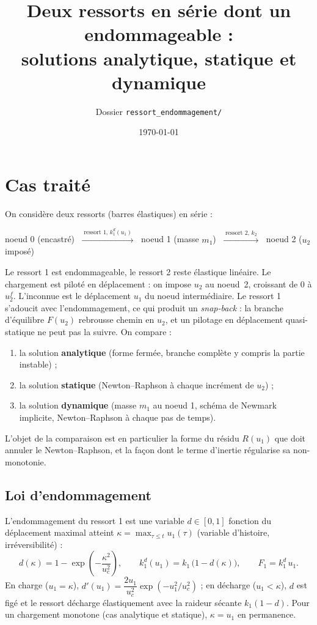 \documentclass[11pt,a4paper]{article}
\title{Deux ressorts en série dont un endommageable :\\
solutions analytique, statique et dynamique}
\author{Dossier \texttt{ressort\_endommagement/}}
\date{\today}
\newcommand{\kd}{k_1^{d}}
\begin{document}
\maketitle

\section{Cas traité}

On considère deux ressorts (barres élastiques) en série :
\begin{center}
noeud 0 (encastré) $\;\xrightarrow{\;\text{ressort 1, } \kd(u_1)\;}\;$ noeud 1 (masse $m_1$)
$\;\xrightarrow{\;\text{ressort 2, } k_2\;}\;$ noeud 2 ($u_2$ imposé)
\end{center}
Le ressort 1 est endommageable, le ressort 2 reste élastique linéaire. Le chargement est piloté en
déplacement : on impose $u_2$ au noeud~2, croissant de $0$ à $u_2^f$. L'inconnue est le déplacement
$u_1$ du noeud intermédiaire. Le ressort 1 s'adoucit avec l'endommagement, ce qui produit un
\emph{snap-back} : la branche d'équilibre $F(u_2)$ rebrousse chemin en $u_2$, et un pilotage en
déplacement quasi-statique ne peut pas la suivre. On compare :
\begin{enumerate}
  \item la solution \textbf{analytique} (forme fermée, branche complète y compris la partie instable) ;
  \item la solution \textbf{statique} (Newton--Raphson à chaque incrément de $u_2$) ;
  \item la solution \textbf{dynamique} (masse $m_1$ au noeud 1, schéma de Newmark implicite,
        Newton--Raphson à chaque pas de temps).
\end{enumerate}
L'objet de la comparaison est en particulier la forme du résidu $R(u_1)$ que doit annuler le
Newton--Raphson, et la façon dont le terme d'inertie régularise sa non-monotonie.

\subsection{Loi d'endommagement}
L'endommagement du ressort 1 est une variable $d\in[0,1]$ fonction du déplacement maximal atteint
$\kappa = \max_{\tau\le t} u_1(\tau)$ (variable d'histoire, irréversibilité) :
\begin{equation}
  d(\kappa) = 1 - \exp\!\left(-\frac{\kappa^2}{u_c^2}\right),\qquad
  \kd(u_1) = k_1\,\bigl(1-d(\kappa)\bigr),\qquad
  F_1 = \kd\,u_1 .
\end{equation}
En charge ($u_1=\kappa$), $d'(u_1) = \dfrac{2u_1}{u_c^2}\exp(-u_1^2/u_c^2)$ ; en décharge
($u_1<\kappa$), $d$ est figé et le ressort décharge élastiquement avec la raideur sécante
$k_1(1-d)$. Pour un chargement monotone (cas analytique et statique), $\kappa=u_1$ en permanence.
\end{document}
